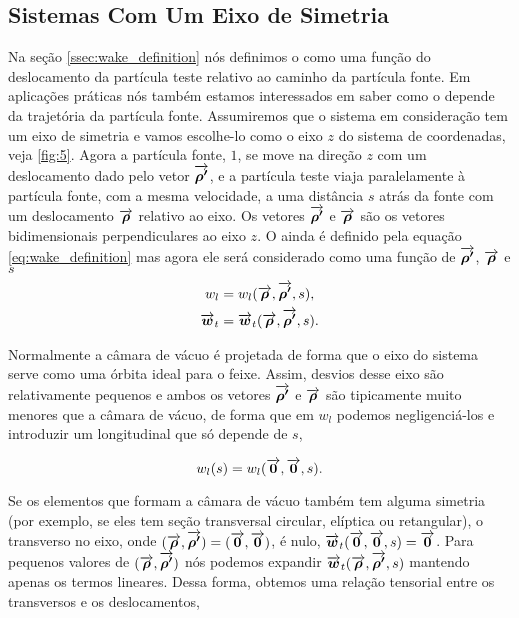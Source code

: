 \subsection{Sistemas Com Um Eixo de Simetria}
Na seção \ref{ssec:wake_definition} nós definimos o  como uma função do deslocamento da partícula teste relativo ao caminho da partícula fonte. Em aplicações práticas nós também estamos interessados em saber como o  depende da trajetória da partícula fonte. Assumiremos que o sistema em consideração tem um eixo de simetria e vamos escolhe-lo como o eixo $z$ do sistema de coordenadas, veja \ref{fig:5}. Agora a partícula fonte, $1$, se move na direção $z$ com um deslocamento dado pelo vetor $\overrightarrow{\boldsymbol{\rho'}}$, e a partícula teste viaja paralelamente à partícula fonte, com a mesma velocidade, a uma distância $s$ atrás da fonte com um deslocamento $\overrightarrow{\boldsymbol{\rho}}$ relativo ao eixo. Os vetores $\overrightarrow{\boldsymbol{\rho'}}$ e $\overrightarrow{\boldsymbol{\rho}}$ são os vetores bidimensionais perpendiculares ao eixo $z$. O  ainda é definido pela equação \eqref{eq:wake_definition} mas agora ele será considerado como uma função de $\overrightarrow{\boldsymbol{\rho'}}$, $\overrightarrow{\boldsymbol{\rho}}$ e $s$
\begin{equation}\begin{aligned}
w_l &= w_l(\overrightarrow{\boldsymbol{\rho}},\overrightarrow{\boldsymbol{\rho'}},s), \\
\overrightarrow{\boldsymbol{w}}_t &= \overrightarrow{\boldsymbol{w}}_t(\overrightarrow{\boldsymbol{\rho}},\overrightarrow{\boldsymbol{\rho'}},s).
\end{aligned}\end{equation}

Normalmente a câmara de vácuo é projetada de forma que o eixo do sistema serve como uma órbita ideal para o feixe. Assim, desvios desse eixo são relativamente pequenos e ambos os vetores $\overrightarrow{\boldsymbol{\rho'}}$ e $\overrightarrow{\boldsymbol{\rho}}$ são tipicamente muito menores que a câmara de vácuo, de forma que em $w_l$ podemos negligenciá-los e introduzir um  longitudinal que só depende de $s$,

\begin{equation}
	w_l(s) = w_l(\overrightarrow{\boldsymbol{0}},\overrightarrow{\boldsymbol{0}},s).
\end{equation}

Se os elementos que formam a câmara de vácuo também tem alguma simetria (por exemplo, se eles tem seção transversal circular, elíptica ou retangular), o  transverso no eixo, onde $(\overrightarrow{\boldsymbol{\rho}},\overrightarrow{\boldsymbol{\rho'}}) = (\overrightarrow{\boldsymbol{0}},\overrightarrow{\boldsymbol{0}})$, é nulo, $\overrightarrow{\boldsymbol{w}}_t(\overrightarrow{\boldsymbol{0}},\overrightarrow{\boldsymbol{0}},s)=\overrightarrow{\boldsymbol{0}}$. Para pequenos valores de $(\overrightarrow{\boldsymbol{\rho}},\overrightarrow{\boldsymbol{\rho'}})$ nós podemos expandir $\overrightarrow{\boldsymbol{w}}_t(\overrightarrow{\boldsymbol{\rho}},\overrightarrow{\boldsymbol{\rho'}},s)$ mantendo apenas os termos lineares. Dessa forma, obtemos uma relação tensorial entre os  transversos e os deslocamentos,

